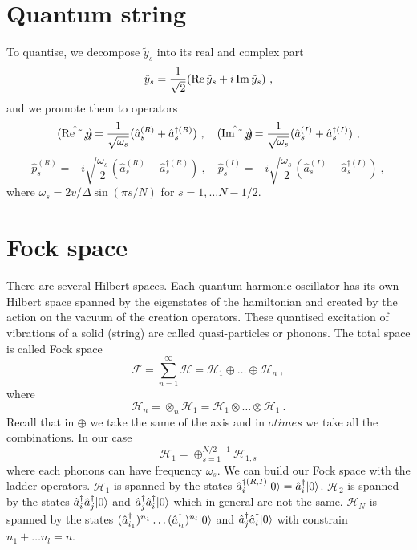 \section{Quantum string}

    To quantise, we decompose $\tilde y_s$ into its real and complex part 
    \begin{equation*}
        \tilde y_s = \frac{1}{\sqrt{2}} (\operatorname{Re} \tilde y_s + i \operatorname{Im} \tilde y_s) ~,
    \end{equation*}
    and we promote them to operators 
    \begin{equation*}
        \hat{(\operatorname{Re} \tilde y_s)} = \frac{1}{\sqrt{\omega_s}} (\hat a_s^{(R)} + \hat a_s^{\dagger(R)}) ~, \quad \hat{(\operatorname{Im} \tilde y_s)} = \frac{1}{\sqrt{\omega_s}} (\hat a_s^{(I)} + \hat a_s^{\dagger(I)}) ~,
    \end{equation*}
    \begin{equation*}
        \hat p_s^{(R)} = - i \sqrt{\frac{\omega_s}{2}} (\hat a_s^{(R)} - \hat a_s^{\dagger(R)}) ~, \quad \hat p_s^{(I)} = - i \sqrt{\frac{\omega_s}{2}} (\hat a_s^{(I)} - \hat a_s^{\dagger(I)}) ~,
    \end{equation*}
    where $\omega_s = 2 v / \Delta \sin (\pi s / N)$ for $s = 1, \ldots N - 1 /2$. 

\section{Fock space}

    There are several Hilbert spaces. Each quantum harmonic oscillator has its own Hilbert space spanned by the eigenstates of the hamiltonian and created by the action on the vacuum of the creation operators. These quantised excitation of vibrations of a solid (string) are called quasi-particles or phonons. The total space is called Fock space 
    \begin{equation*}
        \mathcal F = \sum_{n = 1}^\infty \mathcal H = \mathcal H_1 \oplus \ldots \oplus \mathcal H_n ~,
    \end{equation*}
    where 
    \begin{equation*}
        \mathcal H_n = \otimes_{n} \mathcal H_1 = \mathcal H_1 \otimes \ldots \otimes \mathcal H_1 ~.
    \end{equation*}
    Recall that in $\oplus$ we take the same of the axis and in $otimes$ we take all the combinations. In our case 
    \begin{equation*}
        \mathcal H_1 = \oplus_{s = 1}^{N/2 - 1} \mathcal H_{1, s}
    \end{equation*}
    where each phonons can have frequency $\omega_s$. We can build our Fock space with the ladder operators. $\mathcal H_1$ is spanned by the states $\hat a_i^{\dagger(R, I)} \vert0\rangle = \hat a_i^\dagger \vert0\rangle$. $\mathcal H_2$ is spanned by the states $\hat a_i^\dagger \hat a_j^\dagger \vert0\rangle$ and $\hat a_j^\dagger \hat a_i^\dagger \vert0\rangle$ which in general are not the same. $\mathcal H_N$ is spanned by the states $(\hat a_{i_1}^\dagger)^{n_1}  \ldots (\hat a_{i_l}^\dagger)^{n_l} \vert0\rangle$ and $\hat a_j^\dagger \hat a_i^\dagger \vert0\rangle$ with constrain $n_1 + \ldots n_l = n$.

